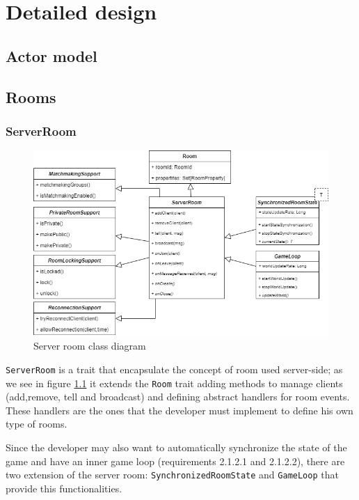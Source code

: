 \chapter{Detailed design}

\section{Actor model}

\section{Rooms}

\subsection{ServerRoom}
\begin{figure}[H]
	\centering
	\includegraphics[scale=0.5]{images/4-design/server-room.png}
	\caption{Server room class diagram}
	\label{fig:server_room_class_diagram}
\end{figure}
\texttt{ServerRoom} is a trait that encapsulate the concept of room used server-side; as we see in figure \ref{fig:server_room_class_diagram} it extends the \texttt{Room} trait adding methods to manage clients (add,remove, tell and broadcast) and defining abstract handlers for room events. These handlers are the ones that the developer must implement to define his own type of rooms.

Since the developer may also want to automatically synchronize the state of the game and have an inner game loop (requirements 2.1.2.1 and 2.1.2.2), there are two extension of the server room: \texttt{SynchronizedRoomState} and \texttt{GameLoop} that provide this functionalities. 

